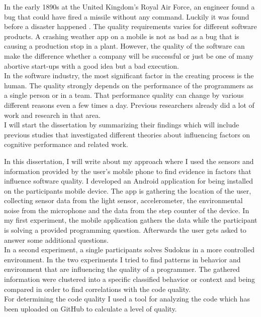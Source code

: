 In the early 1890s at the United Kingdom's Royal Air Force, an engineer found a bug that could have fired a missile without any command. Luckily it was found before a disaster happened \cite{ross2005exterminators}.
\bigbreak
The quality requirements varies for different software products. A crashing weather app on a mobile is not as bad as a bug that is causing a production stop in a plant. 
However, the quality of the software can make the difference whether a company will be successful or just be one of many abortive start-ups with a good idea but a bad execution.
\\
In the software industry, the most significant factor in the creating process is the human. The quality strongly depends on the performance of the programmers as a single person or in a team. That performance quality can change by various different reasons even a few times a day.
\bigbreak 
Previous researchers already did a lot of work and research in that area. \\
I will start the dissertation by summarizing their findings which will include previous studies that investigated different theories about influencing factors on cognitive performance and related work.

\bigbreak
In this dissertation, I will write about my approach where I used the sensors and information provided by the user's mobile phone to find evidence in factors that influence software quality. 
I developed an Android application for being installed on the participants mobile device. The app is gathering the location of the user, collecting sensor data from the light sensor, accelerometer, the environmental noise from the microphone and the data from the step counter of the device. \bigbreak
In my first experiment, the mobile application gathers the data while the participant is solving a provided programming question. 
Afterwards the user gets asked to answer some additional questions. \\
In a second experiment, a single participants solves Sudokus in a more controlled environment. 
In the two experiments I tried to find patterns in behavior and environment that are influencing the quality of a programmer. The gathered information were clustered into a specific classified behavior or context and being compared in order to find correlations with the code quality.\\
For determining the code quality I used a tool for analyzing the code which has been uploaded on GitHub to calculate a level of quality.
\bigbreak

